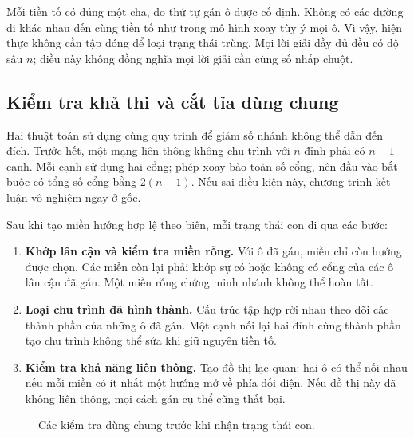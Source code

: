 Mỗi tiền tố có đúng một cha, do thứ tự gán ô được cố định. Không có các đường
đi khác nhau đến cùng tiền tố như trong mô hình xoay tùy ý mọi ô. Vì vậy,
hiện thực không cần tập đóng để loại trạng thái trùng. Mọi lời giải đầy đủ
đều có độ sâu $n$; điều này không đồng nghĩa mọi lời giải cần cùng số nhấp chuột.

\subsection{Kiểm tra khả thi và cắt tỉa dùng chung}\label{sec:pruning}

Hai thuật toán sử dụng cùng quy trình  để giảm số nhánh
không thể dẫn đến đích. Trước hết, một mạng liên thông không chu trình với
$n$ đỉnh phải có $n-1$ cạnh. Mỗi cạnh sử dụng hai cổng; phép xoay bảo toàn số
cổng, nên đầu vào bắt buộc có tổng số cổng bằng $2(n-1)$. Nếu sai điều kiện
này, chương trình kết luận vô nghiệm ngay ở gốc.

Sau khi tạo miền hướng hợp lệ theo biên, mỗi trạng thái con đi qua các bước:
\begin{enumerate}
\item \textbf{Khớp lân cận và kiểm tra miền rỗng.} Với ô đã gán, miền chỉ còn
      hướng được chọn. Các miền còn lại phải khớp sự có hoặc không có cổng
      của các ô lân cận đã gán. Một miền rỗng chứng minh nhánh không thể hoàn tất.
\item \textbf{Loại chu trình đã hình thành.} Cấu trúc tập hợp rời nhau theo
      dõi các thành phần của những ô đã gán. Một cạnh nối lại hai đỉnh cùng
      thành phần tạo chu trình không thể sửa khi giữ nguyên tiền tố.
\item \textbf{Kiểm tra khả năng liên thông.} Tạo đồ thị lạc quan: hai ô có
      thể nối nhau nếu mỗi miền có ít nhất một hướng mở về phía đối diện.
      Nếu đồ thị này đã không liên thông, mọi cách gán cụ thể cũng thất bại.
\end{enumerate}

\begin{figure}[H]\centering
{}
\caption{Các kiểm tra dùng chung trước khi nhận trạng thái con.}
\label{fig:pruning}
\end{figure}

